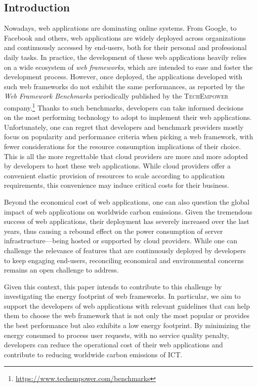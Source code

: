 \subsection{Introduction}
Nowadays, web applications are dominating online systems.
From Google, to Facebook and others, web applications are widely deployed across organizations and continuously accessed by end-users, both for their personal and professional daily tasks.
In practice, the development of these web applications heavily relies on a wide ecosystem of \emph{web frameworks}, which are intended to ease and foster the development process.
However, once deployed, the applications developed with such web frameworks do not exhibit the same performances, as reported by the \emph{Web Framework Benchmarks} periodically published by the \textsc{TechEmpower} company.\footnote{\url{https://www.techempower.com/benchmarks}}
Thanks to such benchmarks, developers can take informed decisions on the most performing technology to adopt to implement their web applications.
Unfortunately, one can regret that developers and benchmark providers mostly focus on popularity and performance criteria when picking a web framework, with fewer considerations for the resource consumption implications of their choice.
This is all the more regrettable that cloud providers are more and more adopted by developers to host these web applications.
While cloud providers offer a convenient elastic provision of resources to scale according to application requirements, this convenience may induce critical costs for their business.

Beyond the economical cost of web applications, one can also question the global impact of web applications on worldwide carbon emissions.
Given the tremendous success of web applications, their deployment has severely increased over the last years, thus causing a rebound effect on the power consumption of server infrastructure---being hosted or supported by cloud providers.
While one can challenge the relevance of features that are continuously deployed by developers to keep engaging end-users, reconciling economical and environmental concerns remains an open challenge to address.

Given this context, this paper intends to contribute to this challenge by investigating the energy footprint of web frameworks.
In particular, we aim to support the developers of web applications with relevant guidelines that can help them to choose the web framework that is not only the most popular or provides the best performance but also exhibits a low energy footprint.
By minimizing the energy consumed to process user requests, with no service quality penalty, developers can reduce the operational cost of their web applications and contribute to reducing worldwide carbon emissions of ICT.

